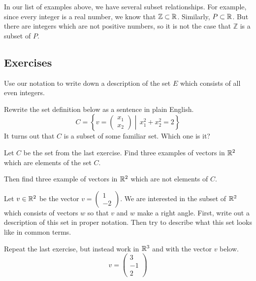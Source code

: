 \documentclass[elementsmain.tex]{subfiles}
\begin{document}
In our list of examples above, we have several subset relationships. For example, since every integer is a real number, we know that $\mathbb{Z} \subset \mathbb{R}$. Similarly, $P \subset \mathbb{R}$. But there are integers which are not positive numbers, so it is not the case that $\mathbb{Z}$ is a subset of $P$.



\subsection*{Exercises}

\begin{exercise}
Use our notation to write down a description of the set $E$ which consists of all even integers.
\end{exercise}

\begin{exercise}
Rewrite the set definition below as a sentence in plain English.
\[
C = \left\{ v = \begin{pmatrix}x_1 \\ x_2 \end{pmatrix} \middle| \, x_1^2 + x_2^2 = 2 \right\}
\]
It turns out that $C$ is a subset of some familiar set. Which one is it?
\end{exercise}


\begin{exercise}
Let $C$ be the set from the last exercise.
Find three examples of vectors in $\mathbb{R}^2$ which are elements of the set $C$.

Then find three example of vectors in $\mathbb{R}^2$ which are not elements of $C$.
\end{exercise}

\begin{exercise}
Let $v \in \mathbb{R}^2$ be the vector $v = \left(\begin{smallmatrix} 1\\-2\end{smallmatrix}\right)$.
We are interested in the subset of $\mathbb{R}^2$ which consists of vectors $w$ so that $v$ and $w$ make a right angle.
First, write out a description of this set in proper notation. Then try to describe what this set looks like in common terms.
\end{exercise}


\begin{exercise}
Repeat the last exercise, but instead work in $\mathbb{R}^3$ and with the vector $v$ below.
\[
v = \begin{pmatrix} 3\\-1\\2\end{pmatrix}
\]
\end{exercise}


\clearpage
\end{document}
